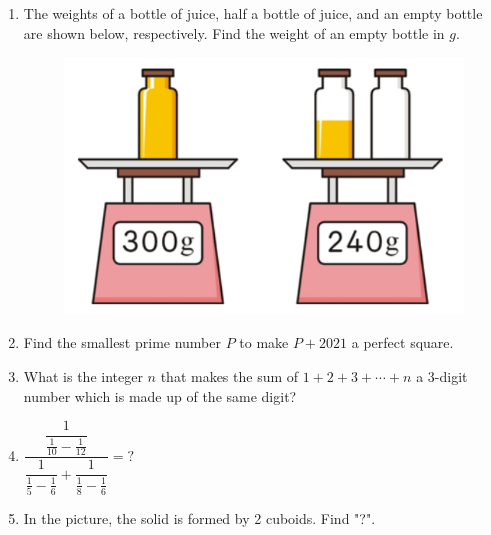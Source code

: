 \documentclass[12pt]{scrartcl}
\begin{document}
\begin{enumerate}
    \item The weights of a bottle of juice, half a bottle of juice, and an empty bottle are shown below, respectively. Find the weight of an empty bottle in $g$.
    
    \begin{figure}[h]
        \centering
        \includegraphics{StarGen/0Figure/wmi-2021-6b-bottle-juice.png}
    \end{figure}
    
    \item Find the smallest prime number $P$ to make $P + 2021$ a perfect square.
    
    \item What is the integer $n$ that makes the sum of $1 + 2 + 3 + \cdots + n$ a 3-digit number which is made up of the same digit?
    
    \item $\dfrac{\dfrac{1}{\frac{1}{10} - \frac{1}{12}}}{\dfrac{1}{\frac{1}{5} - \frac{1}{6}} + \dfrac{1}{\frac{1}{8} - \frac{1}{6}}} = ?$
    
    \item In the picture, the solid is formed by 2 cuboids. Find "?".
    

\end{enumerate}
\end{document}
